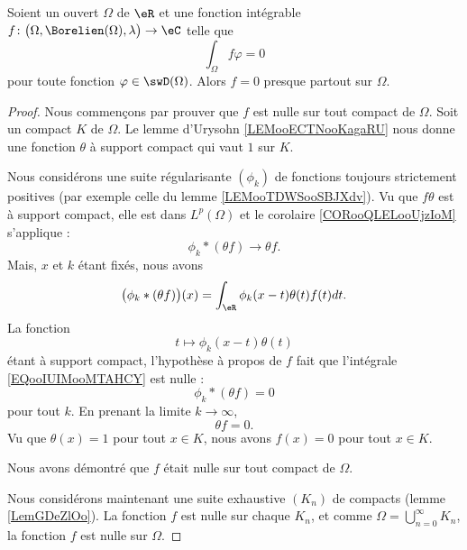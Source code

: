 \begin{proposition} \label{PropAAjSURG}
	Soient un ouvert \( \Omega\) de \( \eR\) et une fonction intégrable \( f\colon \big( \Omega,\Borelien(\Omega),\lambda \big)\to \eC\) telle que
	\begin{equation}
		\int_{\Omega}f\varphi=0
	\end{equation}
	pour toute fonction \( \varphi\in\swD(\Omega)\). Alors \( f=0\) presque partout sur \( \Omega\).
\end{proposition}

\begin{proof}
	Nous commençons par prouver que \( f\) est nulle sur tout compact de \( \Omega\). Soit un compact \( K\) de \( \Omega\). Le lemme d'Urysohn \ref{LEMooECTNooKagaRU} nous donne une fonction \( \theta\) à support compact qui vaut \( 1\) sur \( K\).

	Nous considérons une suite régularisante \( (\phi_k)\) de fonctions toujours strictement positives (par exemple celle du lemme \ref{LEMooTDWSooSBJXdv}). Vu que \( f\theta\) est à support compact, elle est dans \( L^p(\Omega)\) et le corolaire \ref{CORooQLELooUjzIoM} s'applique :
	\begin{equation}
		\phi_k*(\theta f)\to \theta f.
	\end{equation}
	Mais, \( x\) et \( k\) étant fixés, nous avons
	\begin{equation}        \label{EQooIUIMooMTAHCY}
		\big( \phi_k* (\theta f) \big)(x)=\int_{\eR}\phi_k(x-t)\theta(t)f(t)dt.
	\end{equation}
	La fonction
	\begin{equation}
		t\mapsto \phi_k(x-t)\theta(t)
	\end{equation}
	étant à support compact, l'hypothèse à propos de \( f\) fait que l'intégrale \eqref{EQooIUIMooMTAHCY} est nulle :
	\begin{equation}
		\phi_k*(\theta f)=0
	\end{equation}
	pour tout \( k\). En prenant la limite \( k\to \infty\),
	\begin{equation}
		\theta f=0.
	\end{equation}
	Vu que \( \theta(x)=1\) pour tout \( x\in K\), nous avons \( f(x)=0\) pour tout \( x\in K\).

	Nous avons démontré que \( f\) était nulle sur tout compact de \( \Omega\).

	Nous considérons maintenant une suite exhaustive \( (K_n)\) de compacts (lemme \ref{LemGDeZlOo}). La fonction \( f\) est nulle sur chaque \( K_n\), et comme \( \Omega=\bigcup_{n=0}^{\infty}K_n\), la fonction \( f\) est nulle sur \( \Omega\).
\end{proof}


